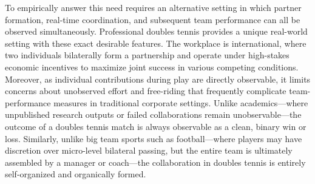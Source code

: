 \documentclass[10pt]{article}
\begin{document}
To empirically answer this need  requires an alternative setting in which partner formation, real-time coordination, and subsequent team performance can all be observed simultaneously. Professional doubles tennis provides a unique real-world setting with these exact desirable features. The workplace is international, where two individuals bilaterally form a partnership and operate under high-stakes economic incentives to maximize joint success in various competing conditions.  Moreover, as individual contributions during play are directly observable, it limits concerns about unobserved effort and free-riding that frequently complicate team-performance measures in traditional corporate settings. Unlike academics—where unpublished research outputs or failed collaborations remain unobservable—the outcome of a doubles tennis match is always observable as a clean, binary win or loss. Similarly, unlike big team sports such as football—where players may have discretion over micro-level bilateral passing, but the entire team is ultimately assembled by a manager or coach—the collaboration in doubles tennis is entirely self-organized and organically formed.
\end{document}
